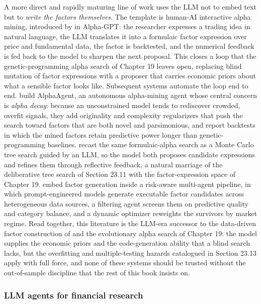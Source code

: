 A more direct and rapidly maturing line of work uses the LLM not to embed text but to \textit{write the factors themselves}. The template is human-AI interactive alpha mining, introduced by \cite{wang2023alphagpt} in Alpha-GPT: the researcher expresses a trading idea in natural language, the LLM translates it into a formulaic factor expression over price and fundamental data, the factor is backtested, and the numerical feedback is fed back to the model to sharpen the next proposal. This closes a loop that the genetic-programming alpha search of Chapter 19 leaves open, replacing blind mutation of factor expressions with a proposer that carries economic priors about what a sensible factor looks like. Subsequent systems automate the loop end to end. \cite{tang2025alphaagent} build AlphaAgent, an autonomous alpha-mining agent whose central concern is \textit{alpha decay}: because an unconstrained model tends to rediscover crowded, overfit signals, they add originality and complexity regularizers that push the search toward factors that are both novel and parsimonious, and report backtests in which the mined factors retain predictive power longer than genetic-programming baselines. \cite{shi2026alphajungle} recast the same formulaic-alpha search as a Monte Carlo tree search guided by an LLM, so the model both proposes candidate expressions and refines them through reflective feedback, a natural marriage of the deliberative tree search of Section 23.11 with the factor-expression space of Chapter 19. \cite{kou2024automate} embed factor generation inside a risk-aware multi-agent pipeline, in which prompt-engineered models generate executable factor candidates across heterogeneous data sources, a filtering agent screens them on predictive quality and category balance, and a dynamic optimizer reweights the survivors by market regime. Read together, this literature is the LLM-era successor to the data-driven factor construction of \cite{gu2018empirical} and the evolutionary alpha search of Chapter 19: the model supplies the economic priors and the code-generation ability that a blind search lacks, but the overfitting and multiple-testing hazards catalogued in Section 23.13 apply with full force, and none of these systems should be trusted without the out-of-sample discipline that the rest of this book insists on.

\subsubsection{LLM agents for financial research}

